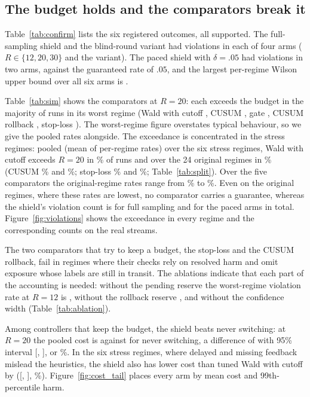 \documentclass[10pt]{article}
\theoremstyle{plain}
\theoremstyle{definition}
\begin{document}
\subsection{The budget holds and the comparators break it}
Table~\ref{tab:confirm} lists the six registered outcomes, all supported.
The full-sampling shield and the blind-round variant had \COneTotal{} violations in each of four arms ($R\in\{12,20,30\}$ and the variant). The paced shield with $\delta=.05$ had \CTwoTotal{} violations in two arms, against the guaranteed rate of $.05$, and the largest per-regime Wilson upper bound over all six arms is \CTwoMaxHi.

Table~\ref{tab:sim} shows the comparators at $R=20$: each exceeds the budget in the majority of runs in its worst regime (Wald with cutoff \WorstWald, CUSUM \WorstCusum, gate \WorstGate, CUSUM rollback \WorstCusumRb, stop-loss \WorstStop).
The worst-regime figure overstates typical behaviour, so we give the pooled rates alongside. The exceedance is concentrated in the stress regimes: pooled (mean of per-regime rates) over the six stress regimes, Wald with cutoff exceeds $R=20$ in \StressExceedWald\% of runs and over the 24 original regimes in \OrigExceedWald\% (CUSUM \StressExceedCusum\% and \OrigExceedCusum\%; stop-loss \StressExceedStop\% and \OrigExceedStop\%; Table~\ref{tab:split}). Over the five comparators the original-regime rates range from \OrigExceedMin\% to \OrigExceedMax\%. Even on the original regimes, where these rates are lowest, no comparator carries a guarantee, whereas the shield's violation count is \COneTotal{} for full sampling and \CTwoTotal{} for the paced arms in total. Figure~\ref{fig:violations} shows the exceedance in every regime and the corresponding counts on the real streams.



The two comparators that try to keep a budget, the stop-loss and the CUSUM rollback, fail in regimes where their checks rely on resolved harm and omit exposure whose labels are still in transit.
The ablations indicate that each part of the accounting is needed: without the pending reserve the worst-regime violation rate at $R=12$ is \AblNoPending, without the rollback reserve \AblNoRollback, and without the confidence width \AblNoConf{} (Table~\ref{tab:ablation}).

Among controllers that keep the budget, the shield beats never switching: at $R=20$ the pooled cost is \JFthreeTwenty{} against \JNever{} for never switching, a difference of \SimVsNeverDelta{} with 95\% interval [\SimVsNeverLo, \SimVsNeverHi], or \SimVsNeverPct\%. In the six stress regimes, where delayed and missing feedback mislead the heuristics, the shield also has lower cost than tuned Wald with cutoff by \StressDelta{} ([\StressLo, \StressHi], \StressPct\%). Figure~\ref{fig:cost_tail} places every arm by mean cost and 99th-percentile harm.
\end{document}
